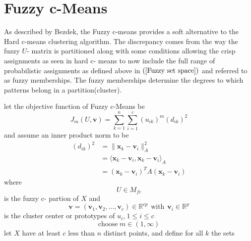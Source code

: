 \documentclass[english]{HSMW-Thesis}
\begin{document}
\section{Fuzzy c-Means}
As described by Bezdek\cite{bezdek1981pattern}, the Fuzzy c-means provides a soft alternative to the Hard c-means clustering algorithm. The discrepancy comes from the way the fuzzy $U$- matrix is partitioned along with some conditions allowing the crisp assignments as seen in hard c- means to now include the full range of probabilistic assignments as defined above in $\left( \ref{Fuzzy set space}\right)$ and referred to as fuzzy memberships. The fuzzy memberships determine the degrees to which patterns belong in a partition(cluster).
\begin{theorem}\cite{bezdek1981pattern}
	let the objective function  of Fuzzy c-Means be
	\begin{equation*}\label{FCM Objective} %
		J_m\left( U,\mathbf{v}\right) =\sum_{k=1}^{n}\sum_{i=1}^{c}\left( u_{ik}\right) ^{m}\left( d_{ik}\right) ^2
	\end{equation*}
	and  assume an inner product norm to be 
	\begin{align*}\label{inner product norm}
		\left( d_{ik}\right)^{2} &= \parallel \mathbf{x}_k - \mathbf{v}_{i}\parallel_{A}^{2}\\
		&= \langle \mathbf{x}_k-\mathbf{v}_i,\mathbf{x}_k-\mathbf{v}_i\rangle_A\\
		&= \left( \mathbf{x}_k-\mathbf{v}_i\right) ^{T}A\left( \mathbf{x}_k-\mathbf{v}_i\right) 
	\end{align*}
	where
	 \begin{equation*}
	 	U\in M_{fc}
	 \end{equation*}
	 is the fuzzy c- partion of\hspace{3pt} $X$  and
	 \begin{equation*}
	 	 \mathbf{v}=\left(\mathbf{v}_1,\mathbf{v}_2,\ldots,\mathbf{v}_c\right)\in \mathbb{R}^{cp}\hspace{5pt} \text{with}\hspace{5pt}  \mathbf{v}_i\in \mathbb{R}^{p}
	 \end{equation*}
	 is the cluster center or prototypes of \hspace{3pt} $u_i$,$\hspace{3pt} 1\leq i \leq c$	
	 \begin{equation*}
	 \text{choose}\hspace{3pt}	m \in \left( 1,\infty\right)
	 \end{equation*}	
	let\hspace{3pt} $X$\hspace{3pt} have at least \hspace{2pt}$c$ less than \hspace{2pt} $n$ \hspace{2pt} distinct points, and define for all\hspace{2pt} $k$\hspace{2pt} the sets

\end{theorem}
\end{document}
